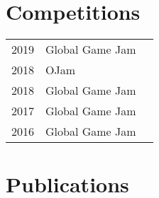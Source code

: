 \documentclass[]{deedy-resume-openfont}
\begin{document}
\begin{minipage}[t]{0.66\textwidth}
\section{Competitions}

\begin{tabular}{rll}

2019	     & Global Game Jam\\

2018	     & OJam\\

2018	     & Global Game Jam\\

2017	     & Global Game Jam\\

2016	     & Global Game Jam\\

\end{tabular}
\sectionsep


\section{Publications} 
\renewcommand\refname{\vskip -1.5em} %


\nocite{*}

\end{minipage} 
\end{document}

